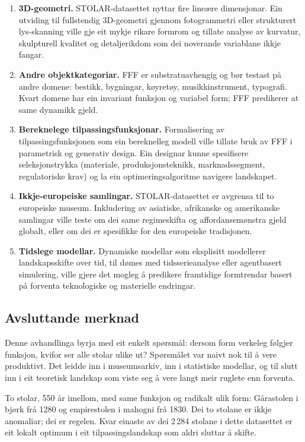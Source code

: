 \documentclass[12pt, a4paper]{article}
\begin{document}
\begin{enumerate}
  \item \textbf{3D-geometri.} STOLAR-datasettet nyttar fire lineære dimensjonar. Ein utviding til fullstendig 3D-geometri gjennom fotogrammetri eller strukturert lys-skanning ville gje eit mykje rikare formrom og tillate analyse av kurvatur, skulpturell kvalitet og detaljerikdom som dei noverande variablane ikkje fangar.
  \item \textbf{Andre objektkategoriar.} FFF er substratuavhengig og bør testast på andre domene: bestikk, bygningar, køyretøy, musikkinstrument, typografi. Kvart domene har ein invariant funksjon og variabel form; FFF predikerer at same dynamikk gjeld.
  \item \textbf{Bereknelege tilpassingsfunksjonar.} Formalisering av tilpassingsfunksjonen som ein bereknelleg modell ville tillate bruk av FFF i parametrisk og generativ design. Ein designar kunne spesifisere seleksjonstrykka (materiale, produksjonsteknikk, marknadssegment, regulatoriske krav) og la ein optimeringsalgoritme navigere landskapet.
  \item \textbf{Ikkje-europeiske samlingar.} STOLAR-datasettet er avgrensa til to europeiske museum. Inkludering av asiatiske, afrikanske og amerikanske samlingar ville teste om dei same regimeskifta og affordansemønstra gjeld globalt, eller om dei er spesifikke for den europeiske tradisjonen.
  \item \textbf{Tidslege modellar.} Dynamiske modellar som eksplisitt modellerer landskapsskifte over tid, til dømes med tidsserieanalyse eller agentbasert simulering, ville gjere det mogleg å predikere framtidige formtrendar basert på forventa teknologiske og materielle endringar.
\end{enumerate}

\subsection{Avsluttande merknad}

Denne avhandlinga byrja med eit enkelt spørsmål: dersom form verkeleg følgjer funksjon, kvifor ser alle stolar ulike ut? Spørsmålet var naivt nok til å vere produktivt. Det leidde inn i museumsarkiv, inn i statistiske modellar, og til slutt inn i eit teoretisk landskap som viste seg å vere langt meir ruglete enn forventa.

To stolar, 550 år imellom, med same funksjon og radikalt ulik form: Gårastolen i bjørk frå 1280 og empirestolen i mahogni frå 1830. Dei to stolane er ikkje anomaliar; dei er regelen. Kvar einaste av dei 2\,284 stolane i dette datasettet er eit lokalt optimum i eit tilpassingslandskap som aldri sluttar å skifte.
\end{document}
